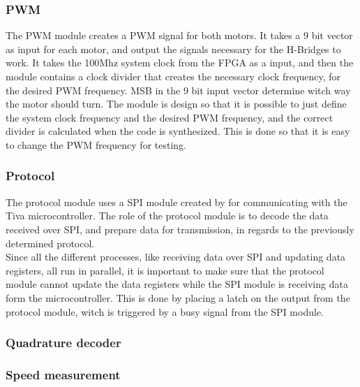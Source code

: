 \documentclass[../../../main]{subfiles}
\begin{document}
\subsubsection{PWM}
The PWM module creates a PWM signal for both motors. It takes a 9 bit vector as input for each motor, and output the signals necessary for the H-Bridges to work.
It takes the 100Mhz system clock from the FPGA as a input, and then the module contains a clock divider that creates the necessary clock frequency, for the desired PWM frequency.
MSB in the 9 bit input vector determine witch way the motor should turn.
The module is design so that it is possible to just define the system clock frequency and the desired PWM frequency, and the correct divider is calculated when the code is synthesized.
This is done so that it is easy to change the PWM frequency for testing.
\subsubsection{Protocol}
The protocol module uses a SPI module created by  for communicating with the Tiva microcontroller.
The role of the protocol module is to decode the data received over SPI, and prepare data for transmission, in regards to the previously determined protocol.
\\
Since all the different processes, like receiving data over SPI and updating data registers, all run in parallel, it is important to make sure that the protocol module cannot update the data registers while the SPI module is receiving data form the microcontroller.
This is done by placing a latch on the output from the protocol module, witch is triggered by a busy signal from the SPI module.

\subsubsection{Quadrature decoder}


\subsubsection{Speed measurement}
\end{document}
